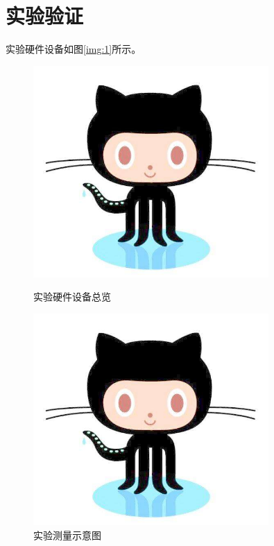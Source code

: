 \documentclass[winfonts,phd,twoside]{njuthesis}
\begin{document}
\chapter{实验验证}

实验硬件设备如图\ref{img:1}所示。
\begin{figure}[htbp]
\begin{minipage}[t]{0.5\textwidth}
\centering
\includegraphics[width=0.8\textwidth]{./figure/github.jpg}
\caption{实验硬件设备总览}
\label{img:1}
\end{minipage}
\begin{minipage}[t]{0.5\textwidth}
\centering
\includegraphics[width=0.8\textwidth]{./figure/github.jpg}
\caption{实验测量示意图}
\label{img:2}
\end{minipage}
\end{figure}
\end{document}
